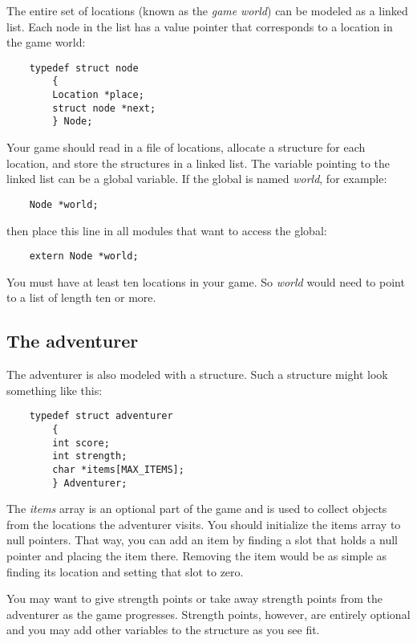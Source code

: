 \documentclass[12pt]{article}
\begin{document}
The entire set of locations
(known as the {\it game} {\it world})
can be modeled as a linked list.
Each node in
the list has a value pointer that
corresponds to a location in the game world:

\begin{verbatim}
    typedef struct node
        {
        Location *place;
        struct node *next;
        } Node;
\end{verbatim}

Your game should read in a file of locations,
allocate a structure for each location, 
and store the structures in a linked list.
The variable pointing to the linked list can be
a global variable. If the global is named {\it world}, for example:

\begin{verbatim}
    Node *world;
\end{verbatim}

then place this line in all modules that want to access the global:

\begin{verbatim}
    extern Node *world;
\end{verbatim}

You must have at least ten locations in your game. So {\it world} would
need to point to a list of length ten or more.

\subsection{The adventurer}

The adventurer is also modeled with a structure. Such a structure
might look something like this:

\begin{verbatim}
    typedef struct adventurer
        {
        int score;
        int strength;
        char *items[MAX_ITEMS];
        } Adventurer;
\end{verbatim}

The {\it items} array is an optional part of the game and
is used to collect objects from the locations the adventurer visits.
You should initialize the items array to null pointers. That way,
you can add an item by finding a slot that holds a null pointer and
placing the item there. Removing the item would be as simple as finding
its location and setting that slot to zero.

You may want to give strength points or take away strength points from
the adventurer as the game progresses. Strength points, however,
are entirely optional and you may add other variables to the structure
as you see fit.
\end{document}
